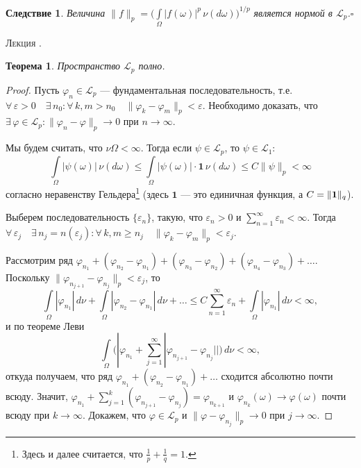 \documentclass[12pt,titlepage]{article}
\newcounter{lec}
\renewcommand{\thelec}{\arabic{lec}}
\newcommand*{\lecture}{\refstepcounter{lec}\vspace{20pt}
\begin{center}{\rmfamily\textsc{Лекция \thelec.}}
\end{center}}
\newcounter{tema}
\newtheorem{theorem}{Теорема}[tema]
\newtheorem{sled}{Следствие}[tema]
\theoremstyle{definition}
\newcommand*{\p}[1]{#1\nobreak\discretionary{}{\hbox{$\mathsurround=0pt #1$}}{}}
\begin{document}
\begin{sled}
Величина
$\|f\|_p=\big(\int\limits_\Omega\!|f(\omega)|^p\,\nu(d\omega)\big)^{1/p}$
является нормой в $\mathcal{L}_p$.\hfill{$\square$}
\end{sled}

\lecture

\begin{theorem}
Пространство $\mathcal{L}_p$ полно.
\end{theorem}

\begin{proof}
Пусть $\varphi_n\in\mathcal{L}_p$ --- фундаментальная
последовательность, т.е. $\forall\,\varepsilon>0\quad\exists\,
n_0:\forall\,k,m> n_0\quad \|\varphi_k-\varphi_m\|_p<\varepsilon$.
Необходимо доказать, что $\exists\,\varphi\in\mathcal{L}_p:
\|\varphi_n-\varphi\|_p\to 0$ при $n\to\infty$.

Мы будем считать, что $\nu\Omega<\infty$. Тогда если
$\psi\in\mathcal{L}_p$, то $\psi\in\mathcal{L}_1$:
$$\int\limits_\Omega\!|\psi(\omega)|\,\nu(d\omega)\leqslant \int\limits_\Omega
\!|\psi(\omega)|\cdot \mathbf{1}\,\nu(d\omega)\leqslant
C\|\psi\|_p<\infty$$ согласно неравенству Гельдера\footnote{Здесь и
далее считается, что $\frac 1 p+\frac 1 q=1$.} (здесь $\mathbf{1}$
--- это единичная функция, а $C\p=\|\mathbf{1}\|_q$).

Выберем последовательность $\{\varepsilon_n\}$, такую, что
$\varepsilon_n>0$ и $\sum\limits_{n=1}^\infty \varepsilon_n<\infty$.
Тогда $\forall\,\varepsilon_j\quad\exists\,n_j=n(\varepsilon_j):
\forall\,k,m\geqslant n_j\quad
\|\varphi_k-\varphi_m\|_p<\varepsilon_j$.

Рассмотрим ряд
$\varphi_{n_1}+(\varphi_{n_2}-\varphi_{n_1})+(\varphi_{n_3}-\varphi_{n_2})+
(\varphi_{n_4}-\varphi_{n_3})+\ldots$. Поскольку
$\|\varphi_{n_{j+1}}-\varphi_{n_j}\|_p<\varepsilon_j$, то
$$\int\limits_\Omega\!|\varphi_{n_1}|\,d\nu+\int\limits_\Omega\!|\varphi_{n_2}-
\varphi_{n_1}|\,d\nu+\ldots\leqslant C\sum\limits_{n=1}^\infty
\varepsilon_n+\int\limits_\Omega\!|\varphi_{n_1}|\,d\nu<\infty,$$ и
по теореме Леви
$$\int\limits_\Omega\!\Big(|\varphi_{n_1}+\sum\limits_{j=1}^\infty
|\varphi_{n_{j+1}}-\varphi_{n_j}||\Big)\,d\nu<\infty,$$ откуда
получаем, что ряд
$\varphi_{n_1}+(\varphi_{n_2}-\varphi_{n_1})+\ldots$ сходится
абсолютно почти всюду. Значит,
$\varphi_{n_1}+\sum\limits_{j=1}^k(\varphi_{n_{j+1}}-\varphi_{n_j})=\varphi_{n_{k+1}}$
и $\varphi_{n_k}(\omega)\to\varphi(\omega)$ почти всюду при
$k\to\infty$. Докажем, что $\varphi\in\mathcal{L}_p$ и
$\|\varphi-\varphi_{n_j}\|_p\to 0$ при $j\to\infty$.


\end{proof}
\end{document}
